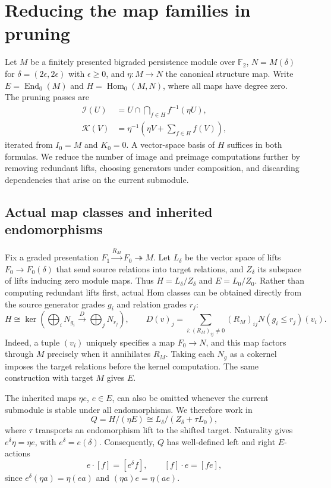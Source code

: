 \documentclass[11pt,a4paper]{article}
\newcommand{\Hom}{\operatorname{Hom}_0}
\newcommand{\End}{\operatorname{End}_0}
\newcommand{\F}{\mathbb F_2}
\begin{document}
\section{Reducing the map families in pruning}
Let $M$ be a finitely presented bigraded persistence module over $\F$,
$N=M(\delta)$ for $\delta=(2\epsilon,2\epsilon)$ with $\epsilon\ge0$, and $\eta:M\to N$
the canonical structure map. Write $E=\End(M)$ and $H=\Hom(M,N)$,
where all maps have degree zero. The pruning passes are
\begin{align}
 \mathcal I(U)&=U\cap\bigcap_{f\in H}f^{-1}(\eta U),\label{eq:i}\\
 \mathcal K(V)&=\eta^{-1}\!\left(\eta V+\sum_{f\in H}f(V)\right),
 \label{eq:k}
\end{align}
iterated from $I_0=M$ and $K_0=0$. A vector-space basis of $H$ suffices
in both formulas. We reduce the number of image and preimage computations
further by removing redundant lifts, choosing generators under composition,
and discarding dependencies that arise on the current submodule.

\subsection{Actual map classes and inherited endomorphisms}
Fix a graded presentation $F_1\xrightarrow{R_M}F_0\twoheadrightarrow M$.
Let $L_\delta$ be the vector space of lifts $F_0\to F_0(\delta)$ that
send source relations into target relations, and $Z_\delta$ its subspace of lifts inducing zero
module maps. Thus $H=L_\delta/Z_\delta$ and $E=L_0/Z_0$.
Rather than computing redundant lifts first, actual Hom classes can be
obtained directly from the source generator grades $g_i$ and relation
grades $r_j$:
\begin{equation}\label{eq:hom}
 H\cong\ker\!\left(\bigoplus_i N_{g_i}
 \xrightarrow{\ D\ }\bigoplus_j N_{r_j}\right),\qquad
 D(v)_j=\sum_{i:(R_M)_{ij}\ne0}(R_M)_{ij}
 N(g_i\le r_j)(v_i).
\end{equation}
Indeed, a tuple $(v_i)$ uniquely specifies a map $F_0\to N$, and this
map factors through $M$ precisely when it annihilates $R_M$. Taking
each $N_g$ as a cokernel imposes the target relations before the kernel
computation. The same construction with target $M$ gives $E$.

The inherited maps $\eta e$, $e\in E$, can also be omitted whenever the
current submodule is stable under all endomorphisms. We therefore work in
\begin{equation}\label{eq:q}
 Q=H/(\eta E)\cong L_\delta/(Z_\delta+\tau L_0),
\end{equation}
where $\tau$ transports an endomorphism lift to the shifted target.
Naturality gives $e^\delta\eta=\eta e$, with $e^\delta=e(\delta)$.
Consequently, $Q$ has well-defined left and right $E$-actions
\[
 e\cdot[f]=[e^\delta f],\qquad [f]\cdot e=[fe],
\]
since $e^\delta(\eta a)=\eta(ea)$ and $(\eta a)e=\eta(ae)$.
\end{document}
